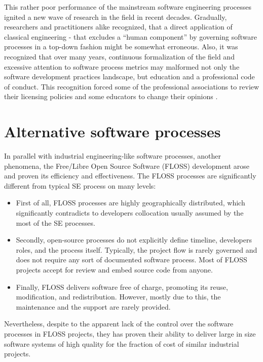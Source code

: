 This rather poor performance of the mainstream software engineering processes 
ignited a new wave of research in the field in recent decades. Gradually, researchers and 
practitioners alike recognized, that a direct application of classical engineering - that 
excludes a ``human component'' by governing software processes in a top-down fashion 
might be somewhat erroneous. 
Also, it was recognized that over many years, continuous formalization of the field and 
excessive attention to software process metrics may malformed not only the software development 
practices landscape, but education and a professional code of conduct. 
This recognition forced some of the professional associations to review their licensing policies 
\cite{citeulike:11045517} and some educators to change their opinions \cite{citeulike:5203446}. 

\section{Alternative software processes}
In parallel with industrial engineering-like software processes, another phenomena, 
the Free/Libre Open Source Software (FLOSS) development arose and proven its efficiency and effectiveness.
The FLOSS processes are significantly different from typical SE process on many levels:
\begin{itemize}
 \item First of all, FLOSS processes are highly geographically distributed, which significantly contradicts 
 to developers collocation usually assumed by the most of the SE processes. 
 \item Secondly, open-source processes do not explicitly define timeline, developers roles, and 
 the process itself. Typically, the project flow is rarely governed and does not require any sort of 
 documented software process. Most of FLOSS projects accept for review and embed source code from anyone.
 \item Finally, FLOSS delivers software free of charge, promoting its reuse, modification, and redistribution.
 However, mostly due to this, the maintenance and the support are rarely provided.
\end{itemize}

Nevertheless, despite to the apparent lack of the control over the software processes in FLOSS projects, they 
has proven their ability to deliver large in size software systems of high quality for the fraction of cost 
of similar industrial projects.

